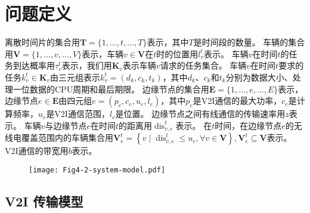 \section{问题定义}\label{section 4-3}

离散时间片的集合用$\mathbf{T}=\{1, \ldots, t, \ldots, T\}$表示，其中$T$是时间段的数量。
车辆的集合用$\mathbf{V}=\{1, \ldots, v, \ldots, V\}$表示，车辆$v \in \mathbf{V}$在$t$时的位置用$l_{v}^{t}$表示。
车辆$v$在时间$t$的任务到达概率用$\tau_{v}^{t}$表示，我们用$\mathbf{K}_{v}$表示车辆$v$请求的任务集合。
车辆$v$在时间$t$要求的任务$k_{v}^{t} \in \mathbf{K}_{v}$由三元组表示$k_{v}^{t}=\left(d_{k}, c_{k}, t_{k}\right)$，其中$d_{k}$、$c_{k}$和$t_{k}$分别为数据大小、处理一位数据的CPU周期和最后期限。
边缘节点的集合用$\mathbf{E}=\{1, \ldots, e, \ldots, E\}$表示，边缘节点$e \in \mathbf{E}$由四元组$e=\left(p_{e}, c_{e}, u_{e}, l_{e}\right)$，其中$p_{e}$是V2I通信的最大功率，$c_{e}$是计算频率，$u_e$是V2I通信范围，$l_{e}$是位置。
边缘节点之间有线通信的传输速率用$z$表示。
车辆$v$与边缘节点$e$在时间$t$的距离用$\operatorname{dis}_{v, e}^{t}$表示。
在$t$时间，在边缘节点$e$的无线电覆盖范围内的车辆集合用$\mathbf{V}_{e}^{t}=\left\{v \mid \operatorname{dis}_{v, e}^{t} \leq u_{e}, \forall v \in \mathbf{V}\right\}, \mathbf{V}_{e}^{t} \subseteq \mathbf{V}$表示。
V2I通信的带宽用$b$表示。

\begin{figure}[h]
\centering
  \texttt{[image: Fig4-2-system-model.pdf]}
  \label{fig 4-2}
\end{figure}

\subsection{V2I 传输模型}


